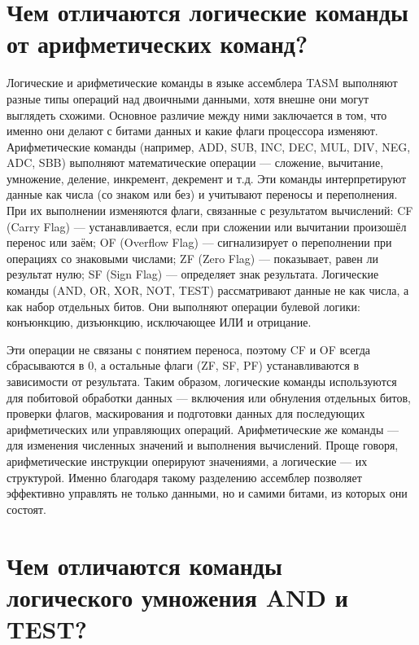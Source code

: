 \section{Чем отличаются логические команды от арифметических команд?}

Логические и арифметические команды в языке ассемблера TASM выполняют разные типы операций над двоичными данными, хотя внешне они могут выглядеть схожими.
Основное различие между ними заключается в том, что именно они делают с битами данных и какие флаги процессора изменяют.
Арифметические команды (например, ADD, SUB, INC, DEC, MUL, DIV, NEG, ADC, SBB) выполняют математические операции — сложение, вычитание, умножение, деление, инкремент, декремент и т.д.
Эти команды интерпретируют данные как числа (со знаком или без) и учитывают переносы и переполнения.
При их выполнении изменяются флаги, связанные с результатом вычислений:
CF (Carry Flag) — устанавливается, если при сложении или вычитании произошёл перенос или заём;
OF (Overflow Flag) — сигнализирует о переполнении при операциях со знаковыми числами;
ZF (Zero Flag) — показывает, равен ли результат нулю;
SF (Sign Flag) — определяет знак результата.
Логические команды (AND, OR, XOR, NOT, TEST) рассматривают данные не как числа, а как набор отдельных битов.
Они выполняют операции булевой логики: конъюнкцию, дизъюнкцию, исключающее ИЛИ и отрицание.

Эти операции не связаны с понятием переноса, поэтому CF и OF всегда сбрасываются в 0, а остальные флаги (ZF, SF, PF) устанавливаются в зависимости от результата.
Таким образом, логические команды используются для побитовой обработки данных — включения или обнуления отдельных битов, проверки флагов, маскирования и подготовки данных для последующих арифметических или управляющих операций.
Арифметические же команды — для изменения численных значений и выполнения вычислений.
Проще говоря, арифметические инструкции оперируют значениями, а логические — их структурой.
Именно благодаря такому разделению ассемблер позволяет эффективно управлять не только данными, но и самими битами, из которых они состоят.


\section{Чем отличаются команды логического умножения AND и TEST?}

